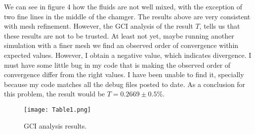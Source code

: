 We can see in figure 4 how the fluids are not well mixed, with the exception of two fine lines in the middle of the chamger. The results above are very consistent with mesh refinement. However, the GCI analysis of the result $T$, tells us that these results are not to be trusted. At least not yet, maybe running another simulation with a finer mesh we find an observed order of convergence within expected values. However, I obtain a negative value, which indicates divergence. I must have some little bug in my code that is making the observed order of convergence differ from the right values. I have been unable to find it, specially because my code matches all the debug files posted to date. As a conclusion for this problem, the result would be $T=0.2669\pm0.5\%$.

\begin{figure}[H]
\centering     %
\texttt{[image: Table1.png]}
\caption{GCI analysis results.}
\end{figure}
